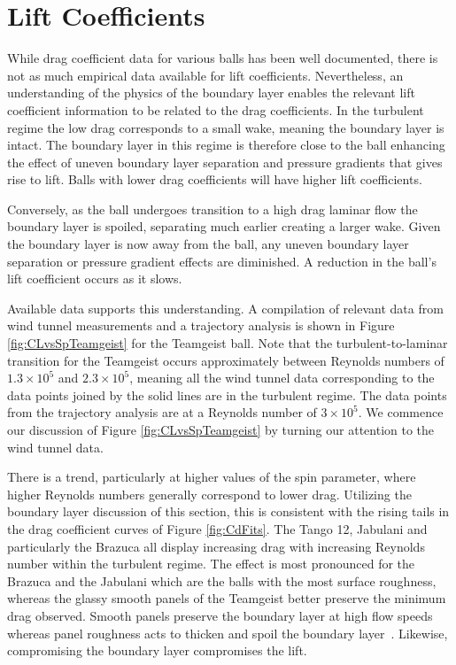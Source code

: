 \documentclass[a4paper]{article}
\begin{document}
%
%
%
\section{Lift Coefficients}
\label{sect:LiftCoefficients}
While drag coefficient data for various balls has been well documented, there is not as much empirical data available for lift coefficients.  Nevertheless, an understanding of the physics of the boundary layer enables the relevant lift coefficient information to be related to the drag coefficients.  In the turbulent regime the low drag corresponds to a small wake, meaning the boundary layer is intact.  The boundary layer in this regime is therefore close to the ball enhancing the effect of uneven boundary layer separation and pressure gradients that gives rise to lift.  Balls with lower drag coefficients will have higher lift coefficients. 

Conversely, as the ball undergoes transition to a high drag laminar flow the boundary layer is spoiled, separating much earlier creating a larger wake.  Given the boundary layer is now away from the ball, any uneven boundary layer separation or pressure gradient effects are diminished.  A reduction in the ball's lift coefficient occurs as it slows.

Available data supports this understanding.  A compilation of relevant data from wind tunnel measurements and a trajectory analysis is shown in Figure \ref{fig:CLvsSpTeamgeist} for the Teamgeist ball.  Note that the turbulent-to-laminar transition for the Teamgeist occurs approximately between Reynolds numbers of $1.3 \times 10^{5}$ and $2.3 \times 10^{5}$, meaning all the wind tunnel data corresponding to the data points joined by the solid lines are in the turbulent regime.  The data points from the trajectory analysis are at a Reynolds number of $3 \times 10^{5}$.  We commence our discussion of Figure \ref{fig:CLvsSpTeamgeist} by turning our attention to the wind tunnel data.

There is a trend, particularly at higher values of the spin parameter, where higher Reynolds numbers generally correspond to lower drag.  Utilizing the boundary layer discussion of this section, this is consistent with the rising tails in the drag coefficient curves of Figure \ref{fig:CdFits}.  The Tango 12, Jabulani and particularly the Brazuca all display increasing drag with increasing Reynolds number within the turbulent regime.  
The effect is most pronounced for the Brazuca and the Jabulani which are the balls with the most surface roughness, whereas the glassy smooth panels of the Teamgeist better preserve the minimum drag observed.  Smooth panels preserve the boundary layer at high flow speeds whereas panel roughness acts to thicken and spoil the boundary layer~\cite{AchenbachEroughsurf, HaakeSJGoodwillSRandCarreMJ}.  Likewise, compromising the boundary layer compromises the lift.
\end{document}

